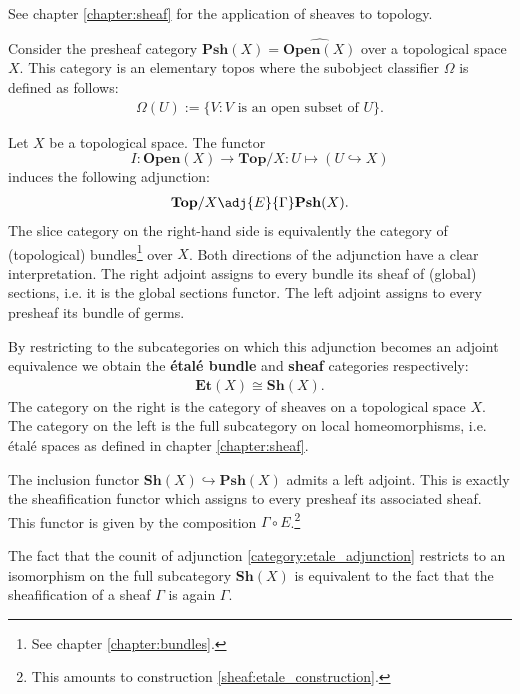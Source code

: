     See chapter \ref{chapter:sheaf} for the application of sheaves to topology.

    \begin{property}\label{topoi:sheaf_topos}
        Consider the presheaf category $\mathbf{Psh}(X) = \widehat{\mathbf{Open}(X)}$ over a topological space $X$. This category is an elementary topos where the subobject classifier $\Omega$ is defined as follows:
        \begin{gather}
            \Omega(U) := \{V:V\text{ is an open subset of }U\}.
        \end{gather}
    \end{property}

    \begin{construct}
        Let $X$ be a topological space. The functor \[I:\mathbf{Open}(X)\rightarrow\mathbf{Top}/X:U\mapsto(U\hookrightarrow X)\] induces the following adjunction:
        \begin{gather}
            \label{category:etale_adjunction}
            \mathbf{Top}/X\adj{E}{\Gamma}\mathbf{Psh}(X).
        \end{gather}
        The slice category on the right-hand side is equivalently the category of (topological) bundles\footnote{See chapter \ref{chapter:bundles}.} over $X$. Both directions of the adjunction have a clear interpretation. The right adjoint assigns to every bundle its sheaf of (global) sections, i.e. it is the global sections functor. The left adjoint assigns to every presheaf its bundle of germs.

        By restricting to the subcategories on which this adjunction becomes an adjoint equivalence we obtain the \textbf{\'etal\'e bundle} and \textbf{sheaf} categories respectively:
        \begin{gather}
            \mathbf{Et}(X)\cong\mathbf{Sh}(X).
        \end{gather}
        The category on the right is the category of sheaves on a topological space $X$. The category on the left is the full subcategory on local homeomorphisms, i.e. \'etal\'e spaces as defined in chapter \ref{chapter:sheaf}.
    \end{construct}

    \begin{property}
        The inclusion functor $\mathbf{Sh}(X)\hookrightarrow\mathbf{Psh}(X)$ admits a left adjoint. This is exactly the sheafification functor which assigns to every presheaf its associated sheaf. This functor is given by the composition $\Gamma\circ E$.\footnote{This amounts to construction \ref{sheaf:etale_construction}.}

        The fact that the counit of adjunction \ref{category:etale_adjunction} restricts to an isomorphism on the full subcategory $\mathbf{Sh}(X)$ is equivalent to the fact that the sheafification of a sheaf $\Gamma$ is again $\Gamma$.
    \end{property}


